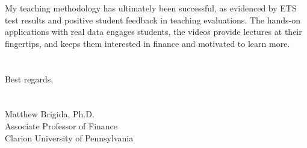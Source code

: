 \documentclass[12pt]{article}
\begin{document}
My teaching methodology has ultimately been successful, as evidenced by ETS test results and positive student feedback in teaching evaluations.  The hands-on applications with real data engages students, the videos provide lectures at their fingertips, and keeps them interested in finance and motivated to learn more. \\
\\
\\
Best regards,\\
\\
\\
Matthew Brigida, Ph.D.\\
Associate Professor of Finance\\
Clarion University of Pennsylvania
\end{document}
